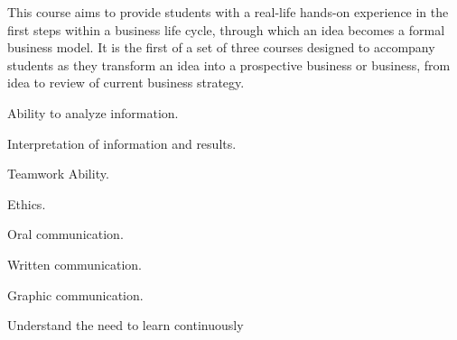 \begin{syllabus}


\begin{justification}
This course aims to provide students with a real-life hands-on experience in the first steps within a business life cycle, through which an idea becomes a formal business model.
It is the first of a set of three courses designed to accompany students as they transform an idea into a prospective business or business, from idea to review of current business strategy.
\end{justification}

\begin{goals}
   \item Ability to analyze information.
   \item Interpretation of information and results.
   \item Teamwork Ability.
   \item Ethics.
   \item Oral communication.
   \item Written communication.
   \item Graphic communication.
   \item Understand the need to learn continuously
\end{goals}

\begin{outcomes}
    \item {} %
    \item {} %
    \item {} %
    \item {} %
    \item {} %
\end{outcomes}

\begin{competences}
    \item {}
    \item {}
    \item {}
\end{competences}



\end{syllabus}
